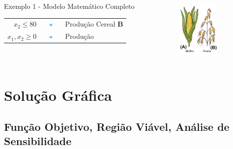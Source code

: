 \documentclass{beamer}
\begin{document}
\begin{frame}
{\begin{columns}
\begin{column}{0.7\textwidth}
\begin{exampleblock}{Exemplo 1 - Modelo Matemático Completo}
\begin{table}
\begin{tabular}{r c l}
						$x_2 \le 80 $ &\includegraphics[width=0.8cm,height=0.2cm]{seta2.png} & Produção Cereal \textbf{B} \\
						$x_1, x_2 \ge 0$ & \includegraphics[width=0.8cm,height=0.2cm]{seta2.png}& Produção \\
					\end{tabular}
				\end{table}
			\end{exampleblock}
		\end{column}
		\begin{column}{0.3\textwidth}
			\centering
			\includegraphics[width=2cm,height=3cm]{milho_aveia2.png}
		\end{column}
	\end{columns}	
	}
\end{frame}

\section{Solução Gráfica}
\subsection{Função Objetivo, Região Viável, Análise de Sensibilidade}
\end{document}
